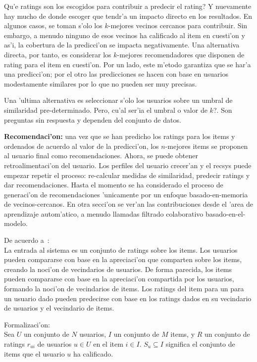 \documentclass[11pt]{article}
\begin{document}
\smallskip
\textquestiondown Qu'e ratings son los escogidos para contribuir a predecir el rating? Y nuevamente hay mucho de donde escoger que tendr'a un impacto directo en los resultados. En algunos casos, se toman s'olo los $k$-mejores vecinos cercanos para contribuir. Sin embargo, a menudo ninguno de esos vecinos ha calificado al item en cuesti'on y as'i, la cobertura de la predicci'on se impacta negativamente. Una alternativa directa, por tanto, es considerar los $k$-mejores recomendadores que disponen de rating para el item en cuesti'on. Por un lado, este m'etodo garantiza que se har'a una predicci'on; por el otro las predicciones se hacen con base en usuarios modestamente similares por lo que no pueden ser muy precisas.

Una 'ultima alternativa es seleccionar s'olo los usuarios sobre un umbral de similaridad pre-determinado. Pero, \textquestiondown cu'al ser'ia el umbral o valor de $k$?. Son preguntas sin respuesta y dependen del conjunto de datos.

\smallskip
\textbf{Recomendaci'on:} una vez que se han predicho los ratings para los items y ordenados de acuerdo al valor de la predicci'on, los $n$-mejores items se proponen al usuario final como recomendaciones. Ahora, se puede obtener retroalimentaci'on del usuario. Los perfiles del usuario crecer'an y el recsys puede empezar repetir el proceso: re-calcular medidas de similaridad, predecir ratings y dar recomendaciones. Hasta el momento se ha considerado el proceso de generaci'on de recomendaciones 'unicamente por un enfoque basado-en-memoria de vecinos-cercanos. En otra secci'on se ver'an las contribuciones desde el 'area de aprendizaje autom'atico, a menudo llamadas filtrado colaborativo basado-en-el-modelo.

\medskip
De acuerdo a~\cite{start:candillier09}:\\
La entrada al sistema es un conjunto de ratings sobre los items. Los usuarios pueden compararse con base en la apreciaci'on que comparten sobre los items, creando la noci'on de vecindarios de usuarios. De forma parecida, los items pueden compararse con base en la apreciaci'on compartida por los usuarios, formando la noci'on de vecindarios de items. Los ratings del item para un para un usuario dado  pueden predecirse con base en los ratings dados en su vecindario de usuarios y el vecindario de items.

Formalizaci'on:\\
Sea $U$ un conjunto de $N$ usuarios, $I$ un conjunto de $M$ items, y $R$ un conjunto de ratings $r_{ui}$ de usuarios $u \in U$ en el item $i \in I$. $S_u \subseteq I$ significa el conjunto de items que el usuario $u$ ha calificado.
\end{document}
